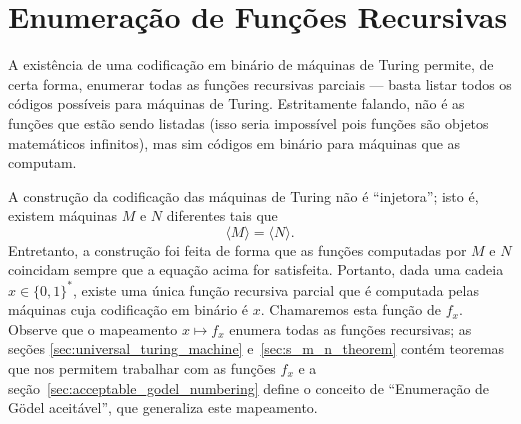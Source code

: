 \section{Enumeração de Funções Recursivas}
\label{sec:definition_enumeration_of_recursive_functions}

A existência de uma codificação em binário de máquinas de Turing
permite, de certa forma,
enumerar todas as funções recursivas parciais
--- basta listar todos os códigos possíveis para máquinas de Turing.
Estritamente falando,
não é as funções que estão sendo listadas
(isso seria impossível pois funções são objetos matemáticos infinitos),
mas sim códigos em binário para máquinas que as computam.

A construção da codificação das máquinas de Turing não é ``injetora'';
isto é, existem máquinas $M$ e $N$ diferentes
tais que
\begin{equation*}
    \langle M \rangle = \langle N \rangle.
\end{equation*}
Entretanto,
a construção foi feita de forma que
as funções computadas por $M$ e $N$ coincidam
sempre que a equação acima for satisfeita.
Portanto,
dada uma cadeia $x \in \{0, 1\}^*$,
existe uma única função recursiva parcial
que é computada pelas máquinas cuja codificação em binário é $x$.
Chamaremos esta função de $f_x$.
Observe que o mapeamento $x \mapsto f_x$
enumera todas as funções recursivas;
as seções \ref{sec:universal_turing_machine} e~\ref{sec:s_m_n_theorem}
contém teoremas que nos permitem trabalhar com as funções $f_x$
e a seção~\ref{sec:acceptable_godel_numbering}
define o conceito de ``Enumeração de Gödel aceitável'',
que generaliza este mapeamento.
